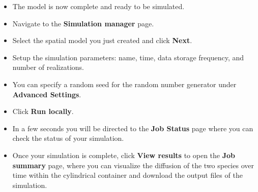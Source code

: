 \begin{itemize}

 
\item The model is now complete and ready to be simulated.

\item Navigate to the \textbf{Simulation manager} page.

\item Select the spatial model you just created and click \textbf{Next}.
\item Setup the simulation parameters: name, time, data storage frequency, and number of realizations. 
\item You can specify a random seed for the random number generator under \textbf{Advanced Settings}.
\item Click \textbf{Run locally}.
\item In a few seconds you will be directed to the \textbf{Job Status} page where you can check the status of your simulation.
\item Once your simulation is complete, click \textbf{View results} to open the \textbf{Job summary} page, where you can visualize the diffusion of the two species over time within the cylindrical container and download the output files of the simulation.

\end{itemize}



